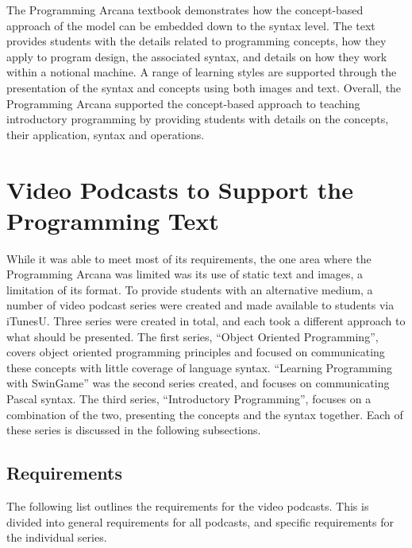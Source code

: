 The Programming Arcana textbook demonstrates how the concept-based approach of the model can be embedded down to the syntax level. The text provides students with the details related to programming concepts, how they apply to program design, the associated syntax, and details on how they work within a notional machine. A range of learning styles are supported through the presentation of the syntax and concepts using both images and text. Overall, the Programming Arcana supported the concept-based approach to teaching introductory programming by providing students with details on the concepts, their application, syntax and operations. 



\clearpage
\section{Video Podcasts to Support the Programming Text} %
\label{sec:vodcasts}

While it was able to meet most of its requirements, the one area where the Programming Arcana was limited was its use of static text and images, a limitation of its format. To provide students with an alternative medium, a number of video podcast series were created and made available to students via iTunesU. Three series were created in total, and each took a different approach to what should be presented. The first series, ``Object Oriented Programming'', covers object oriented programming principles and focused on communicating these concepts with little coverage of language syntax. ``Learning Programming with SwinGame'' was the second series created, and focuses on communicating Pascal syntax. The third series, ``Introductory Programming'', focuses on a combination of the two, presenting the concepts and the syntax together. Each of these series is discussed in the following subsections.

\subsection{Requirements} %
\label{sub:vodcast_requirements}

The following list outlines the requirements for the video podcasts. This is divided into general requirements for all podcasts, and specific requirements for the individual series.

